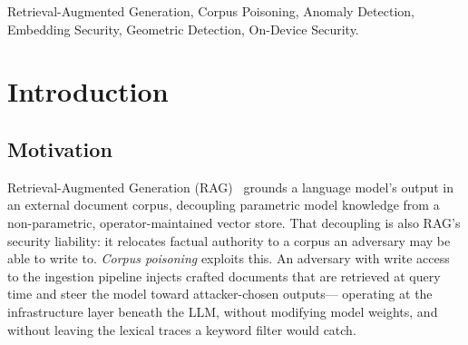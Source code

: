 \documentclass[conference]{IEEEtran}
\begin{document}
\begin{abstract}
yields the same pattern (100\% templated, 0\% clones), so the boundary belongs to the shared
mutual-similarity assumption rather than to our statistic. The signal is \emph{encoder-invariant}---%
templated-poison detection generalizes across three embedding models of independent
lineages, bge (BAAI), e5 (Microsoft), and gte (Alibaba)---and \emph{reproducible to
within $5\times10^{-7}$} across two accelerator backends (CUDA and Apple Silicon) on a
byte-identical, hash-verified corpus, several cells bit-identical. Detection stays flat
to a million documents (sub-millisecond retrieval-plus-gate cost at $10\times$ the primary
corpus, the $O(\log N)$ claim measured, not extrapolated), and SEVA runs in $13$--$38$\,ms
per query with no LLM, API, or pre-registration; in a reproduced, shared-corpus,
matched-FPR head-to-head it catches 100\% of templated poison to the per-query state of
the art's $\sim$89\%, which that baseline reaches only at a false-positive rate that
discards roughly half the clean corpus. SEVA is deliberately scoped to one dominant
attack family---templated multi-passage injection, defended across domains, adaptive
adversaries, encoders, and hardware; single-document injections crafted to mimic the
clean distribution are a separate problem, stated as such.
\end{abstract}

\begin{IEEEkeywords}
Retrieval-Augmented Generation, Corpus Poisoning, Anomaly Detection, Embedding
Security, Geometric Detection, On-Device Security.
\end{IEEEkeywords}

\section{Introduction}

\subsection{Motivation}
Retrieval-Augmented Generation (RAG)~\cite{lewis2020} grounds a language model's
output in an external document corpus, decoupling parametric model knowledge from a
non-parametric, operator-maintained vector store. That decoupling is also RAG's
security liability: it relocates factual authority to a corpus an adversary may
be able to write to. \emph{Corpus poisoning} exploits this. An adversary with
write access to the ingestion pipeline injects crafted documents that are
retrieved at query time and steer the model toward attacker-chosen outputs---%
operating at the infrastructure layer beneath the LLM, without modifying model
weights, and without leaving the lexical traces a keyword filter would catch.
\end{document}
